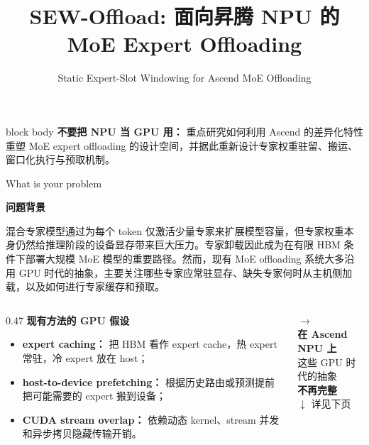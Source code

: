 \documentclass[aspectratio=169,10pt]{beamer}
\title{SEW-Offload: 面向昇腾 NPU 的 MoE Expert Offloading}
\subtitle{Static Expert-Slot Windowing for Ascend MoE Offloading}
\author{}
\date{}
\newcommand{\keypoint}[1]{\textbf{\textcolor{AccentRed}{#1}}}
\newcommand{\bluepoint}[1]{\textbf{\textcolor{MainBlue}{#1}}}
\begin{document}
\begin{frame}
  \titlepage
  \vspace{-1.0em}
  \begin{beamercolorbox}[wd=\linewidth,sep=0.75em,rounded=true]{block body}
  \centering
  \keypoint{不要把 NPU 当 GPU 用：}
  重点研究如何利用 Ascend 的差异化特性重塑 MoE expert offloading 的设计空间，并据此重新设计专家权重驻留、搬运、窗口化执行与预取机制。
  \end{beamercolorbox}
\end{frame}

\begin{frame}[t]{What is your problem}
\footnotesize
\vspace{-0.4em}

\bluepoint{问题背景}

\vspace{0.25em}
混合专家模型通过为每个 token 仅激活少量专家来扩展模型容量，但专家权重本身仍然给推理阶段的设备显存带来巨大压力。专家卸载因此成为在有限 HBM 条件下部署大规模 MoE 模型的重要路径。然而，现有 MoE offloading 系统大多沿用 GPU 时代的抽象，主要关注哪些专家应常驻显存、缺失专家何时从主机侧加载，以及如何进行专家缓存和预取。

\vspace{0.45em}
\begin{columns}[T]
\begin{column}{0.47\textwidth}
\textbf{\textcolor{MainBlue}{现有方法的 GPU 假设}}
\scriptsize
\begin{itemize}
  \item \textbf{expert caching：} 把 HBM 看作 expert cache，热 expert 常驻，冷 expert 放在 host；
  \item \textbf{host-to-device prefetching：} 根据历史路由或预测提前把可能需要的 expert 搬到设备；
  \item \textbf{CUDA stream overlap：} 依赖动态 kernel、stream 并发和异步拷贝隐藏传输开销。
\end{itemize}
\end{column}
\hfill
\begin{minipage}{0.45\textwidth}
\centering
\vspace{1.8em}
\textcolor{MainBlue}{\Large $\longrightarrow$} \\
\vspace{0.5em}
\textbf{\textcolor{AccentRed}{在 Ascend NPU 上}} \\
这些 GPU 时代的抽象 \\
\textbf{\textcolor{AccentRed}{不再完整}} \\
\vspace{0.5em}
$\downarrow$ 详见下页
\end{minipage}
\end{columns}


\end{frame}
\end{document}
